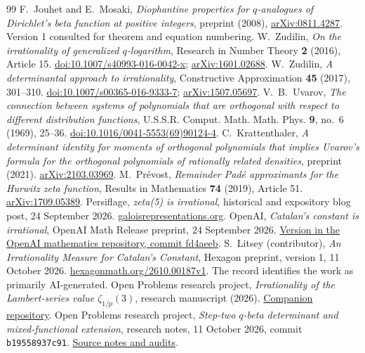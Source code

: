 \begin{thebibliography}{99}
 F.~Jouhet and E.~Mosaki, \emph{Diophantine properties for $q$-analogues of Dirichlet's beta function at positive integers}, preprint (2008), \href{https://arxiv.org/abs/0811.4287}{arXiv:0811.4287}. Version 1 consulted for theorem and equation numbering.
 W.~Zudilin, \emph{On the irrationality of generalized $q$-logarithm}, Research in Number Theory \textbf{2} (2016), Article 15. \href{https://doi.org/10.1007/s40993-016-0042-x}{doi:10.1007/s40993-016-0042-x}; \href{https://arxiv.org/abs/1601.02688}{arXiv:1601.02688}.
 W.~Zudilin, \emph{A determinantal approach to irrationality}, Constructive Approximation \textbf{45} (2017), 301--310. \href{https://doi.org/10.1007/s00365-016-9333-7}{doi:10.1007/s00365-016-9333-7}; \href{https://arxiv.org/abs/1507.05697}{arXiv:1507.05697}.
 V.~B.~Uvarov, \emph{The connection between systems of polynomials that are orthogonal with respect to different distribution functions}, U.S.S.R. Comput. Math. Math. Phys. \textbf{9}, no.~6 (1969), 25--36. \href{https://doi.org/10.1016/0041-5553(69)90124-4}{doi:10.1016/0041-5553(69)90124-4}.
 C.~Krattenthaler, \emph{A determinant identity for moments of orthogonal polynomials that implies Uvarov's formula for the orthogonal polynomials of rationally related densities}, preprint (2021). \href{https://arxiv.org/abs/2103.03969}{arXiv:2103.03969}.
 M.~Pr\'evost, \emph{Remainder Pad\'e approximants for the Hurwitz zeta function}, Results in Mathematics \textbf{74} (2019), Article 51. \href{https://arxiv.org/abs/1709.05389}{arXiv:1709.05389}.
 Persiflage, \emph{zeta(5) is irrational}, historical and expository blog post, 24 September 2026. \href{https://galoisrepresentations.org/2026/09/24/zeta5-is-irrational/}{galoisrepresentations.org}.
 OpenAI, \emph{Catalan's constant is irrational}, OpenAI Math Release preprint, 24 September 2026. \href{https://github.com/openai/math/blob/fd4aeeb/preprints/Catalans-constant-is-irrational-September-24-2026/paper.pdf}{Version in the OpenAI mathematics repository, commit fd4aeeb}.
 S.~Litsey (contributor), \emph{An Irrationality Measure for Catalan's Constant}, Hexagon preprint, version 1, 11 October 2026. \href{https://hexagonmath.org/2610.00187v1}{hexagonmath.org/2610.00187v1}. The record identifies the work as primarily AI-generated.
 Open Problems research project, \emph{Irrationality of the Lambert-series value $\zeta_{1/p}(3)$}, research manuscript (2026). \href{https://github.com/uplift-universal-inc/qzeta3-irrationality}{Companion repository}.
 Open Problems research project, \emph{Step-two $q$-beta determinant and mixed-functional extension}, research notes, 11 October 2026, commit \texttt{b19558937c91}. \href{https://github.com/fikreab-s/the-math-research-ledger/tree/b19558937c91876d6330c8464871e146a820c909/problems/odd-zeta/computations/alternatives_20261011}{Source notes and audits}.
\end{thebibliography}
